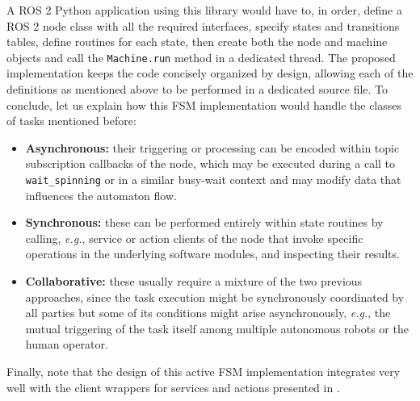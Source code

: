 A ROS 2 Python application using this library would have to, in order, define a ROS 2 node class with all the required interfaces, specify states and transitions tables, define routines for each state, then create both the node and machine objects and call the \texttt{Machine.run} method in a dedicated thread. The proposed implementation keeps the code concisely organized by design, allowing each of the definitions as mentioned above to be performed in a dedicated source file. To conclude, let us explain how this FSM implementation would handle the classes of tasks mentioned before:
\begin{itemize}
  \item \textbf{Asynchronous:} their triggering or processing can be encoded within topic subscription callbacks of the node, which may be executed during a call to \texttt{wait\_spinning} or in a similar busy-wait context and may modify data that influences the automaton flow.
  \item \textbf{Synchronous:} these can be performed entirely within state routines by calling, \emph{e.g.}, service or action clients of the node that invoke specific operations in the underlying software modules, and inspecting their results.
  \item \textbf{Collaborative:} these usually require a mixture of the two previous approaches, since the task execution might be synchronously coordinated by all parties but some of its conditions might arise asynchronously, \emph{e.g.}, the mutual triggering of the task itself among multiple autonomous robots or the human operator.
\end{itemize}
Finally, note that the design of this active FSM implementation integrates very well with the client wrappers for services and actions presented in .

